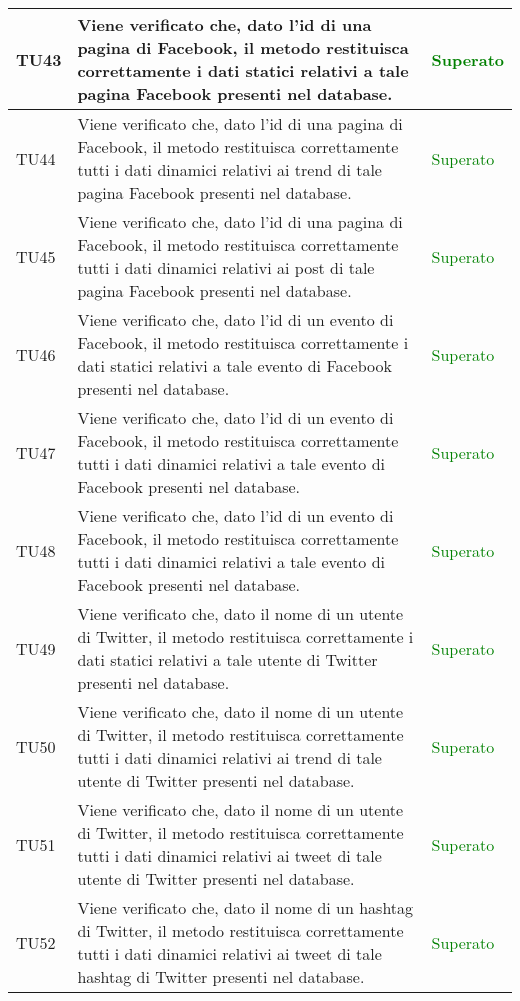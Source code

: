 \begin{center}
\begin{longtable}{| p{2cm} | p{8cm} | p{2.5cm} |}
					\hline
					TU43 & Viene verificato che, dato l'id di una pagina di Facebook, il metodo restituisca correttamente i dati statici relativi a tale pagina Facebook presenti nel database. & \textcolor{green}{Superato}\\
					\hline
					TU44 & Viene verificato che, dato l'id di una pagina di Facebook, il metodo restituisca correttamente tutti i dati dinamici relativi ai trend di tale pagina Facebook presenti nel database. & \textcolor{green}{Superato}\\
					\hline
					TU45 & Viene verificato che, dato l'id di una pagina di Facebook, il metodo restituisca correttamente tutti i dati dinamici relativi ai post di tale pagina Facebook presenti nel database. & \textcolor{green}{Superato}\\
					\hline
					TU46 & Viene verificato che, dato l'id di un evento di Facebook, il metodo restituisca correttamente i dati statici relativi a tale evento di Facebook presenti nel database. & \textcolor{green}{Superato}\\
					\hline
					TU47 & Viene verificato che, dato l'id di un evento di Facebook, il metodo restituisca correttamente tutti i dati dinamici relativi a tale evento di Facebook presenti nel database. & \textcolor{green}{Superato}\\
					\hline
					TU48 & Viene verificato che, dato l'id di un evento di Facebook, il metodo restituisca correttamente tutti i dati dinamici relativi a tale evento di Facebook presenti nel database. & \textcolor{green}{Superato}\\
					\hline
					TU49 & Viene verificato che, dato il nome di un utente di Twitter, il metodo restituisca correttamente i dati statici relativi a tale utente di Twitter presenti nel database. & \textcolor{green}{Superato}\\
					\hline
					TU50 & Viene verificato che, dato il nome di un utente di Twitter, il metodo restituisca correttamente tutti i dati dinamici relativi ai trend di tale utente di Twitter presenti nel database. & \textcolor{green}{Superato}\\
					\hline
					TU51 & Viene verificato che, dato il nome di un utente di Twitter, il metodo restituisca correttamente tutti i dati dinamici relativi ai tweet di tale utente di Twitter presenti nel database. & \textcolor{green}{Superato}\\
					\hline
					TU52 & Viene verificato che, dato il nome di un hashtag di Twitter, il metodo restituisca correttamente tutti i dati dinamici relativi ai tweet di tale hashtag di Twitter presenti nel database. & \textcolor{green}{Superato}\\

\end{longtable}
\end{center}
